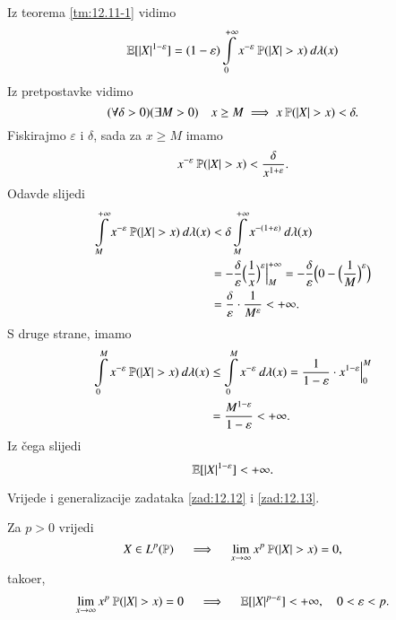 \begin{rj}[\ref{zad:12.13}]
    Iz teorema \ref{tm:12.11-1} vidimo
    \begin{equation*}
            \mathbb{E} [|X|^{1-\varepsilon}] = (1 - \varepsilon) \int\limits_{0}^{+\infty} x^{-\varepsilon} \: \mathbb{P} (|X| > x) \: d \lambda (x)
    \end{equation*}
    Iz pretpostavke vidimo
    \begin{equation*}
        (\forall \delta > 0) (\exists M > 0) \quad x \geq M \implies x \: \mathbb{P} (|X| > x) < \delta.
    \end{equation*}
    Fiskirajmo $\varepsilon$ i $\delta$, sada za $x \geq M$ imamo
    \begin{equation*}
        x^{-\varepsilon} \: \mathbb{P} (|X| > x) < \frac{\delta}{x^{1 + \varepsilon}}.
    \end{equation*}
    Odavde slijedi
    \begin{equation*}
        \begin{aligned}
            \int\limits_{M}^{+\infty} x^{-\varepsilon} \: \mathbb{P} (|X| > x) \: d \lambda (x) &< \delta \int\limits_{M}^{+\infty} x^{-(1 + \varepsilon)} \: d \lambda (x)\\
            &= -\frac{\delta}{\varepsilon} \Big( \frac{1}{x} \Big)^{\varepsilon} \Big|_{M}^{+\infty} = - \frac{\delta}{\varepsilon} \Big(0 - \Big( \frac{1}{M} \Big)^\varepsilon \Big)\\
            &= \frac{\delta}{\varepsilon} \cdot \frac{1}{M^\varepsilon} < +\infty.
        \end{aligned} 
    \end{equation*}
    S druge strane, imamo
    \begin{equation*}
        \begin{aligned}
            \int\limits_{0}^{M} x^{-\varepsilon} \: \mathbb{P} (|X| > x) \: d \lambda (x) &\leq \int\limits_{0}^{M} x^{-\varepsilon} \: d \lambda (x) = \frac{1}{1 - \varepsilon} \cdot x^{1 - \varepsilon} \Big|_0^M\\
            &= \frac{M^{1 - \varepsilon}}{1 - \varepsilon} < +\infty.
        \end{aligned}
    \end{equation*}
    Iz \v cega slijedi
    \begin{equation*}
        \mathbb{E} [|X|^{1 - \varepsilon}] < +\infty.
    \end{equation*}
\end{rj}

\begin{nap} \label{nap:12.13-1}
    Vrijede i generalizacije zadataka \ref{zad:12.12} i \ref{zad:12.13}.

    Za $p > 0$ vrijedi
    \begin{equation*}
        X  \in L^p (\mathbb{P}) \quad \implies \quad \lim\limits_{x \to \infty} x^p \: \mathbb{P} (|X| > x) = 0,
    \end{equation*}
    tako\dj er,
    \begin{equation*}
        \lim\limits_{x \to \infty} x^p \: \mathbb{P} (|X| > x) = 0 \quad \implies \quad \mathbb{E} [ |X|^{p-\varepsilon} ] < +\infty, \quad 0 < \varepsilon < p.
    \end{equation*}
\end{nap}

